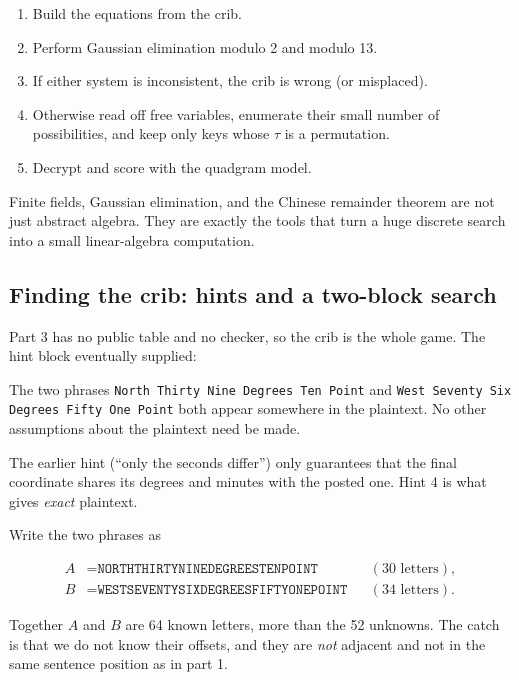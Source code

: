 \documentclass[11pt]{article}
\begin{document}
\begin{enumerate}[label=\arabic*.]
  \item Build the equations from the crib.
  \item Perform Gaussian elimination modulo 2 and modulo 13.
  \item If either system is inconsistent, the crib is wrong (or misplaced).
  \item Otherwise read off free variables, enumerate their small number of
        possibilities, and keep only keys whose $\tau$ is a permutation.
  \item Decrypt and score with the quadgram model.
\end{enumerate}

\begin{lesson}
Finite fields, Gaussian elimination, and the Chinese remainder theorem are not
just abstract algebra.  They are exactly the tools that turn a huge discrete
search into a small linear-algebra computation.
\end{lesson}

\subsection{Finding the crib: hints and a two-block search}

Part 3 has no public table and no checker, so the crib is the whole game.  The
hint block eventually supplied:

\begin{tcolorbox}[colback=boxyellow,colframe=orange!70!black]
[Puzzle 4] The two phrases \texttt{North Thirty Nine Degrees Ten Point} and
\texttt{West Seventy Six Degrees Fifty One Point} both appear somewhere in the
plaintext.  No other assumptions about the plaintext need be made.
\end{tcolorbox}

The earlier hint (``only the seconds differ'') only guarantees that the final
coordinate shares its degrees and minutes with the posted one.  Hint 4 is what
gives \emph{exact} plaintext.

Write the two phrases as

\begin{align*}
A &= \texttt{NORTHTHIRTYNINEDEGREESTENPOINT} &&(30\text{ letters}),\\
B &= \texttt{WESTSEVENTYSIXDEGREESFIFTYONEPOINT} &&(34\text{ letters}).
\end{align*}

Together $A$ and $B$ are 64 known letters, more than the 52 unknowns.  The
catch is that we do not know their offsets, and they are \emph{not} adjacent
and not in the same sentence position as in part 1.
\end{document}

